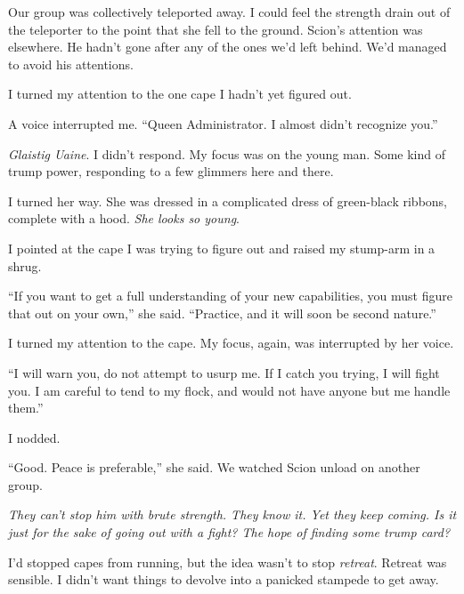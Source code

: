 Our group was collectively teleported away.  I could feel the strength drain out of the teleporter to the point that she fell to the ground.  Scion's attention was elsewhere.  He hadn't gone after any of the ones we'd left behind.  We'd managed to avoid his attentions.



I turned my attention to the one cape I hadn't yet figured out.



A voice interrupted me.  ``Queen Administrator.  I almost didn't recognize you.''



\emph{Glaistig Uaine}.  I didn't respond.  My focus was on the young man.  Some kind of trump power, responding to a few glimmers here and there.



I turned her way.  She was dressed in a complicated dress of green-black ribbons, complete with a hood.  \emph{She looks so young}.



I pointed at the cape I was trying to figure out and raised my stump-arm in a shrug.



``If you want to get a full understanding of your new capabilities, you must figure that out on your own,'' she said.  ``Practice, and it will soon be second nature.''



I turned my attention to the cape.  My focus, again, was interrupted by her voice.



``I will warn you, do not attempt to usurp me.  If I catch you trying, I will fight you.  I am careful to tend to my flock, and would not have anyone but me handle them.''



I nodded.



``Good.  Peace is preferable,'' she said.  We watched Scion unload on another group.



\emph{They can't stop him with brute strength.  They know it.  Yet they keep coming.  Is it just for the sake of going out with a fight?  The hope of finding some trump card?}



I'd stopped capes from running, but the idea wasn't to stop \emph{retreat}.  Retreat was sensible.  I didn't want things to devolve into a panicked stampede to get away.



